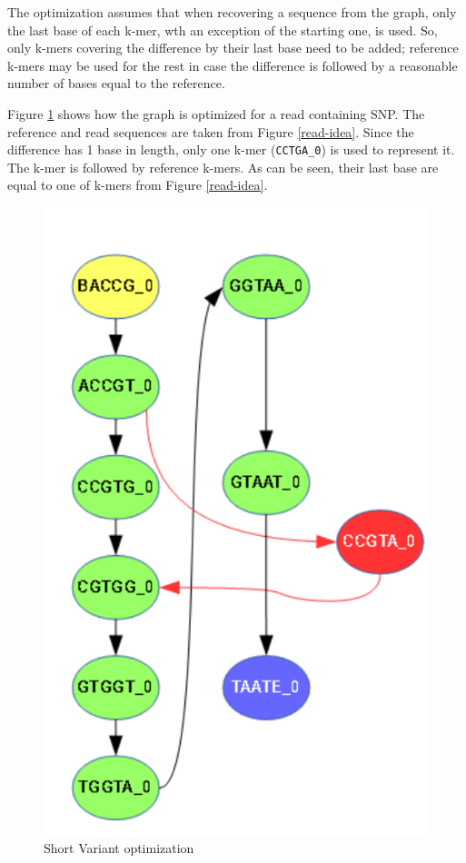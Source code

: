 The optimization assumes that when recovering a sequence from the graph, only the last base of each k-mer, wth an exception of the starting one, is used. So, only k-mers covering the difference by their last base need to be added; reference k-mers may be used for the rest in case the difference is followed by a reasonable number of bases equal to the reference. 

Figure \ref{fig:read-optimization} shows how the graph is optimized for a read containing SNP. The reference and read sequences are taken from Figure \ref{read-idea}. Since the difference has 1 base in length, only one k-mer (\texttt{CCTGA\_0}) is used to represent it. The k-mer is followed by reference k-mers. As can be seen, their last base are equal to one of k-mers from Figure \ref{read-idea}.

\begin{figure}
	\centering
	\includegraphics{img/read-optimization.pdf}
	\caption{Short Variant optimization}
	\label{fig:read-optimization}
\end{figure}

